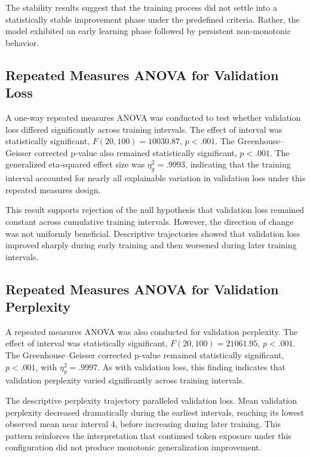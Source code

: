 \documentclass{article}
\begin{document}
The stability results suggest that the training process did not settle into a statistically stable improvement phase under the predefined criteria. Rather, the model exhibited an early learning phase followed by persistent non-monotonic behavior.

\subsection{Repeated Measures ANOVA for Validation Loss}

A one-way repeated measures ANOVA was conducted to test whether validation loss differed significantly across training intervals. The effect of interval was statistically significant, $F(20, 100) = 10030.87$, $p < .001$. The Greenhouse--Geisser corrected p-value also remained statistically significant, $p < .001$. The generalized eta-squared effect size was $\eta^2_g = .9993$, indicating that the training interval accounted for nearly all explainable variation in validation loss under this repeated measures design.

This result supports rejection of the null hypothesis that validation loss remained constant across cumulative training intervals. However, the direction of change was not uniformly beneficial. Descriptive trajectories showed that validation loss improved sharply during early training and then worsened during later training intervals.

\subsection{Repeated Measures ANOVA for Validation Perplexity}

A repeated measures ANOVA was also conducted for validation perplexity. The effect of interval was statistically significant, $F(20, 100) = 21061.95$, $p < .001$. The Greenhouse--Geisser corrected p-value remained statistically significant, $p < .001$, with $\eta^2_g = .9997$. As with validation loss, this finding indicates that validation perplexity varied significantly across training intervals.

The descriptive perplexity trajectory paralleled validation loss. Mean validation perplexity decreased dramatically during the earliest intervals, reaching its lowest observed mean near interval 4, before increasing during later training. This pattern reinforces the interpretation that continued token exposure under this configuration did not produce monotonic generalization improvement.
\end{document}
